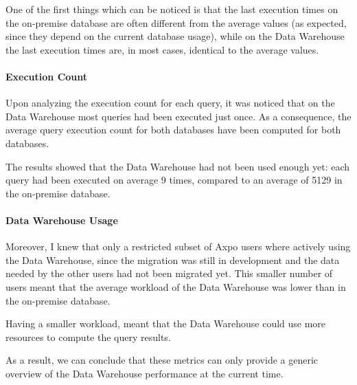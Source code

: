     One of the first things which can be noticed is that the last execution times on the on-premise database are often different from the average values (as expected, since they depend on the current database usage), while on the Data Warehouse the last execution times are, in most cases, identical to the average values.
    
    \paragraph{Execution Count}
        Upon analyzing the execution count for each query, it was noticed that on the Data Warehouse most queries had been executed just once.
        As a consequence, the average query execution count for both databases have been computed for both databases.
        
        The results showed that the Data Warehouse had not been used enough yet: each query had been executed on average 9 times, compared to an average of 5129 in the on-premise database.
        
    \paragraph {Data Warehouse Usage}
        Moreover, I knew that only a restricted subset of Axpo users where actively using the Data Warehouse, since the migration was still in development and the data needed by the other users had not been migrated yet.
        This smaller number of users meant that the average workload of the Data Warehouse was lower than in the on-premise database.
        
        Having a smaller workload, meant that the Data Warehouse could use more resources to compute the query results.
        
        As a result, we can conclude that these metrics can only provide a generic overview of the Data Warehouse performance at the current time.

